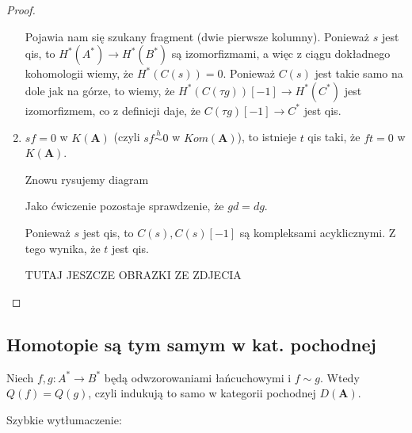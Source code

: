 \begin{proof}
\begin{enumerate}
        Pojawia nam się szukany fragment (dwie pierwsze kolumny). Ponieważ $s$ jest qis, to $H^*(A^*)\to H^*(B^*)$ są izomorfizmami, a więc z ciągu dokładnego kohomologii wiemy, że $H^*(C(s))=0$. Ponieważ $C(s)$ jest takie samo na dole jak na górze, to wiemy, że $H^*(C(\tau g))[-1]\to H^*(C^*)$ jest izomorfizmem, co z definicji daje, że $C(\tau g)[-1]\to C^*$ jest qis.

      \item $sf=0$ w $K(\mathbf{A})$ (czyli $sf\overset{h}{\sim} 0$ w $Kom(\mathbf{A})$), to istnieje $t$ qis taki, że $ft=0$ w $K(\mathbf{A})$.

        Znowu rysujemy diagram 
        \begin{center}\end{center}

        Jako ćwiczenie pozostaje sprawdzenie, że $gd=dg$.

        Ponieważ $s$ jest qis, to $C(s), C(s)[-1]$ są kompleksami acyklicznymi. Z tego wynika, że $t$ jest qis. 

        {\large\color{red}TUTAJ JESZCZE OBRAZKI ZE ZDJECIA}
  \end{enumerate}
\end{proof}

\subsection{Homotopie są tym samym w kat. pochodnej}

\begin{lemma}
  Niech $f,g:A^*\to B^*$ będą odwzorowaniami łańcuchowymi i $f\sim g$. Wtedy $Q(f)=Q(g)$, czyli indukują to samo w kategorii pochodnej $D(\mathbf{A})$.
\end{lemma}

Szybkie wytłumaczenie:
\begin{center}\end{center}

